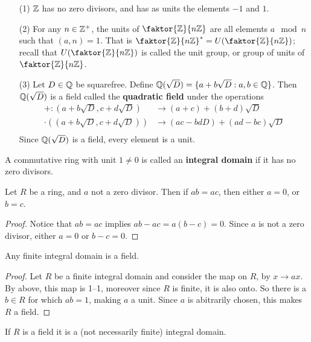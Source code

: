 \begin{example}\label{1.3}
    \begin{enumerate}
        \item[(1)] $\mathbb{Z}$ has no zero divisors, and has as units the elements $-1$
            and $1$.

        \item[(2)] For any $n \in \mathbb{Z}^+$, the units of  $\faktor{\Z}{n\Z}$ are
            all elements $a \mod{n}$ such that $(a,n)=1$. That is
            $\faktor{\Z}{n\Z}^\ast=U(\faktor{\Z}{n\Z})$; recall that
            $U(\faktor{\Z}{n\Z})$ is called the unit group, or group of units of
            $\faktor{\Z}{n\Z}$.

        \item[(3)] Let $D \in \mathbb{Q}$ be squarefree. Define
            $\mathbb{Q}(\sqrt{D})=\{a+b\sqrt{D} : a,b \in \mathbb{Q}\}$. Then $\mathbb{Q}(\sqrt{D})$ is
            a field called the \textbf{quadratic field} under the operations
            \begin{align*}
                +:(a+b\sqrt{D}, c+d\sqrt{D})    & \xrightarrow{} (a+c)+(b+d)\sqrt{D} \\
                \cdot((a+b\sqrt{D}, c+d\sqrt{D}))   &   \xrightarrow{}
                (ac-bdD)+(ad-bc)\sqrt{D} \\
            \end{align*}
            Since $\mathbb{Q}(\sqrt{D})$ is a field, every element is a unit.
    \end{enumerate}
\end{example}

\begin{definition}
    A commutative ring with unit $1 \neq 0$ is called an \textbf{integral
    domain} if it has no zero divisors.
\end{definition}

\begin{lemma}\label{1.1.3}
    Let $R$ be a ring, and $a$ not a zero divisor. Then if $ab=ac$, then either
    $a=0$, or  $b=c$.
\end{lemma}
\begin{proof}
    Notice that $ab=ac$ implies  $ab-ac=a(b-c)=0$. Since $a$ is not a zero
    divisor, either  $a=0$ or  $b-c=0$.
\end{proof}
\begin{corollary}
    Any finite integral domain is a field.
\end{corollary}
\begin{proof}
    Let $R$ be a finite integral domain and consider the map on $R$, by $x
    \xrightarrow{} ax$. By above, this map is 1--1, moreover since $R$ is
    finite, it is also onto. So there is a $b \in R$ for which $ab=1$, making
    $a$ a unit. Since $a$ is abitrarily chosen, this makes $R$ a field.
\end{proof}
\begin{corollary}
    If $R$ is a field it is a (not necessarily finite) integral domain.
\end{corollary}

